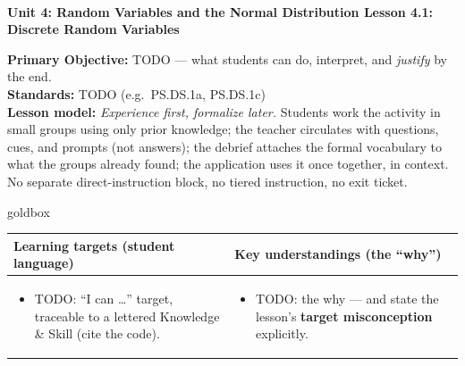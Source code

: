 \documentclass[10pt]{article}
\newcommand{\UnitNumberName}{Unit 4: Random Variables and the Normal Distribution \quad}
\newcommand{\LessonNumberName}{Lesson 4.1: Discrete Random Variables}
\begin{document}
\begin{center}
    {\Large\bfseries \CourseName \\
    {\small\bfseries \UnitNumberName \LessonNumberName}}
\end{center}

\begin{tcolorbox}[colback=frost, colframe=cerulean, boxrule=0.9pt, arc=2mm,
    left=2mm, right=2mm, top=1.5mm, bottom=1.5mm]
    \textbf{Primary Objective:} TODO --- what students can do, interpret, and \emph{justify}
    by the end.
    \\[2pt]
    \textbf{Standards:} TODO (e.g.\ PS.DS.1a, PS.DS.1c)
    \\[2pt]
    \textbf{Lesson model:} \emph{Experience first, formalize later.} Students work the activity
    in small groups using only prior knowledge; the teacher circulates with questions, cues, and
    prompts (not answers); the debrief attaches the formal vocabulary to what the groups already
    found; the application uses it once together, in context. No separate direct-instruction
    block, no tiered instruction, no exit ticket.
\end{tcolorbox}

\renewcommand{\arraystretch}{1.4}
\begin{skillbox}{goldbox}
\begin{tabularx}{\linewidth}{@{}X|X@{}}
\textbf{Learning targets (student language)} & \textbf{Key understandings (the ``why'')} \\[2pt]
\hline
\vspace{-6pt}
\begin{itemize}[leftmargin=1.1em, nosep, after=\vspace{2pt}]
  \item TODO: ``I can \dots'' target, traceable to a lettered Knowledge \& Skill (cite the code).
\end{itemize}
&
\vspace{-6pt}
\begin{itemize}[leftmargin=1.1em, nosep, after=\vspace{2pt}]
  \item TODO: the why --- and state the lesson's \textbf{target misconception} explicitly.
\end{itemize}
\end{tabularx}
\end{skillbox}
\end{document}
